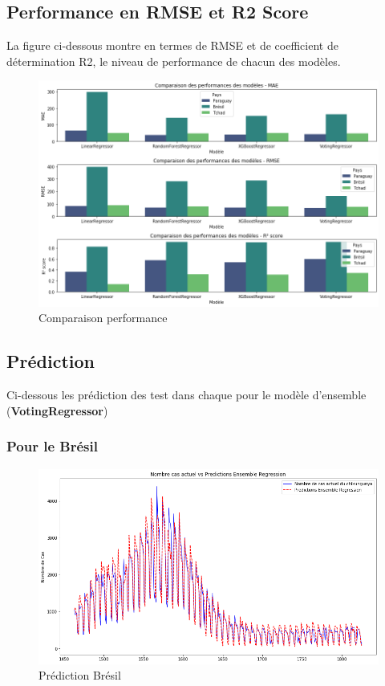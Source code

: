 \subsection{Performance en RMSE et R2 Score}
La figure ci-dessous montre en termes de RMSE et de coefficient de détermination R2, le niveau de performance de chacun des modèles.
\begin{figure}[h!]
	\centering
	\includegraphics[width=0.9\linewidth]{images/metric_comparaison}
	\caption{Comparaison performance}
	\label{fig:metriccomparaison}
\end{figure}
\newpage
\subsection{Prédiction}
Ci-dessous les prédiction des test dans chaque pour le modèle d'ensemble (\textbf{VotingRegressor})
\subsubsection{Pour le Brésil}
\begin{figure}[h!]
	\centering
	\includegraphics[width=0.9\linewidth]{images/prediction_bresil}
	\caption{Prédiction Brésil}
	\label{fig:predictionbresil}
\end{figure}

